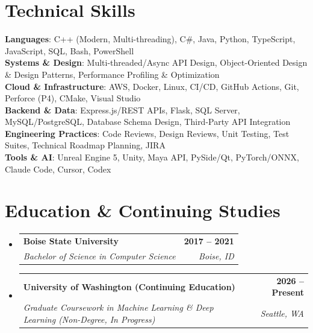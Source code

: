 \documentclass[letterpaper,11pt]{article}
\makeatletter
\newcommand{\resumeSubheading}[4]{
  \vspace{-2pt}\item
    \begin{tabular*}{1.0\textwidth}[t]{l@{\extracolsep{\fill}}r}
      \textbf{#1} & \textbf{\small #2} \\
      \textit{\small#3} & \textit{\small #4} \\
    \end{tabular*}\vspace{-7pt}
}
\newcommand{\resumeSubHeadingListStart}{\begin{itemize}[leftmargin=0.0in, label={}]}
\newcommand{\resumeSubHeadingListEnd}{\end{itemize}}
\makeatother
\begin{document}
\section{Technical Skills}
 \begin{itemize}[leftmargin=0.15in, label={}]
    \small{\item{
     \textbf{Languages}{: C++ (Modern, Multi-threading), C\#, Java, Python, TypeScript, JavaScript, SQL, Bash, PowerShell} \\
     \textbf{Systems \& Design}{: Multi-threaded/Async API Design, Object-Oriented Design \& Design Patterns, Performance Profiling \& Optimization} \\
     \textbf{Cloud \& Infrastructure}{: AWS, Docker, Linux, CI/CD, GitHub Actions, Git, Perforce (P4), CMake, Visual Studio} \\
     \textbf{Backend \& Data}{: Express.js/REST APIs, Flask, SQL Server, MySQL/PostgreSQL, Database Schema Design, Third-Party API Integration} \\
     \textbf{Engineering Practices}{: Code Reviews, Design Reviews, Unit Testing, Test Suites, Technical Roadmap Planning, JIRA} \\
     \textbf{Tools \& AI}{: Unreal Engine 5, Unity, Maya API, PySide/Qt, PyTorch/ONNX, Claude Code, Cursor, Codex}
    }}
 \end{itemize}
 \vspace{-12pt}

\section{Education \& Continuing Studies}
  \resumeSubHeadingListStart
    \resumeSubheading
      {Boise State University}{2017 -- 2021}
      {Bachelor of Science in Computer Science}{Boise, ID}
    \resumeSubheading
      {University of Washington (Continuing Education)}{2026 -- Present}
      {Graduate Coursework in Machine Learning \& Deep Learning (Non-Degree, In Progress)}{Seattle, WA}
  \resumeSubHeadingListEnd
\end{document}
